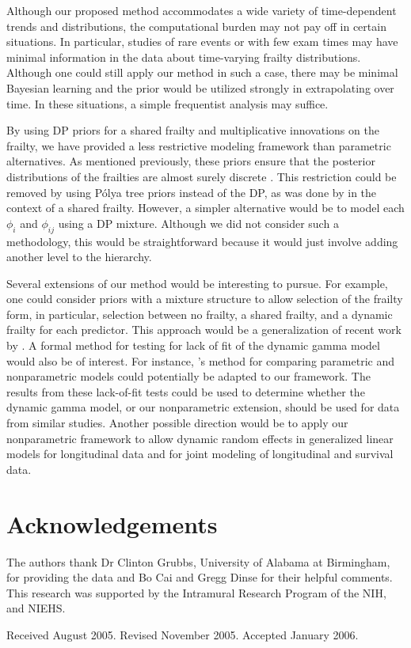 \documentclass[10pt, letterpaper]{article}
\begin{document}
Although our proposed method accommodates a wide variety of time-dependent trends and distributions, the computational burden may not pay off in certain situations. In particular, studies of rare events or with few exam times may have minimal information in the data about time-varying frailty distributions. Although one could still apply our method in such a case, there may be minimal Bayesian learning and the prior would be utilized strongly in extrapolating over time. In these situations, a simple frequentist analysis may suffice.

By using DP priors for a shared frailty and multiplicative innovations on the frailty, we have provided a less restrictive modeling framework than parametric alternatives. As mentioned previously, these priors ensure that the posterior distributions of the frailties are almost surely discrete \citep{Blackwell1973}. This restriction could be removed by using P\'olya tree priors \citep{Lavine1992, Lavine1994} instead of the DP, as was done by \citet{Walker1997} in the context of a shared frailty. However, a simpler alternative would be to model each $\phi_i$ and $\phi_{ij}$ using a DP mixture. Although we did not consider such a methodology, this would be straightforward because it would just involve adding another level to the hierarchy.

Several extensions of our method would be interesting to pursue. For example, one could consider priors with a mixture structure to allow selection of the frailty form, in particular, selection between no frailty, a shared frailty, and a dynamic frailty for each predictor. This approach would be a generalization of recent work by \citet{Dunson2004}. A formal method for testing for lack of fit of the dynamic gamma model would also be of interest. For instance, \citet{Berger2001}'s method for comparing parametric and nonparametric models could potentially be adapted to our framework. The results from these lack-of-fit tests could be used to determine whether the dynamic gamma model, or our nonparametric extension, should be used for data from similar studies. Another possible direction would be to apply our nonparametric framework to allow dynamic random effects in generalized linear models for longitudinal data and for joint modeling of longitudinal and survival data.

\section*{Acknowledgements}
The authors thank Dr Clinton Grubbs, University of Alabama at Birmingham, for providing the data and Bo Cai and Gregg Dinse for their helpful comments. This research was supported by the Intramural Research Program of the NIH, and NIEHS.


\newpage %
\noindent Received August 2005. Revised November 2005. Accepted January 2006.
\end{document}
